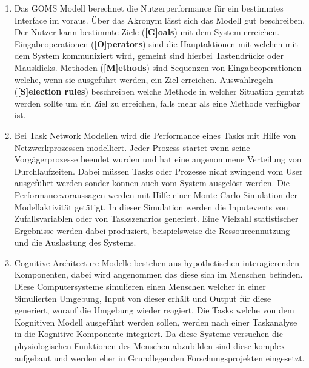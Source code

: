 \documentclass[draft=false
              ,paper=a4
              ,twoside=false
              ,fontsize=11pt
              ,headsepline
              ,BCOR10mm
              ,DIV11
              ]{scrbook}
\begin{document}
\begin{enumerate}
  \item Das GOMS Modell berechnet die Nutzerperformance für ein bestimmtes Interface im voraus. Über das Akronym lässt sich das Modell gut beschreiben. Der Nutzer kann bestimmte Ziele (\textbf{[G]oals}) mit dem System erreichen. Eingabeoperationen (\textbf{[O]perators}) sind die Hauptaktionen mit welchen mit dem System kommuniziert wird, gemeint sind hierbei Tastendrücke oder Mausklicks. Methoden (\textbf{[M]ethods}) sind Sequenzen von Eingabeoperationen welche, wenn sie ausgeführt werden, ein Ziel erreichen. Auswahlregeln (\textbf{[S]election rules}) beschreiben welche Methode in welcher Situation genutzt werden sollte um ein Ziel zu erreichen, falls mehr als eine Methode verfügbar ist.
  \item Bei Task Network Modellen wird die Performance eines Tasks mit Hilfe von Netzwerkprozessen modelliert. Jeder Prozess startet wenn seine Vorgägerprozesse beendet wurden und hat eine angenommene Verteilung von Durchlaufzeiten. Dabei müssen Tasks oder Prozesse nicht zwingend vom User ausgeführt werden sonder können auch vom System ausgelöst werden. Die Performancevoraussagen werden mit Hilfe einer Monte-Carlo Simulation der Modellaktivität getätigt. In dieser Simulation werden die Inputevents von Zufallsvariablen oder von Taskszenarios generiert. Eine Vielzahl statistischer Ergebnisse werden dabei produziert, beispielsweise die Ressourcennutzung und die Auslastung des Systems.
  \item Cognitive Architecture Modelle bestehen aus hypothetischen interagierenden Komponenten, dabei wird angenommen das diese sich im Menschen befinden. Diese Computersysteme simulieren einen Menschen welcher in einer Simulierten Umgebung, Input von dieser erhält und Output für diese generiert, worauf die Umgebung wieder reagiert. Die Tasks welche von dem Kognitiven Modell ausgeführt werden sollen, werden nach einer Taskanalyse in die Kognitive Komponente integriert. Da diese Systeme versuchen die physiologischen Funktionen des Menschen abzubilden sind diese komplex aufgebaut und werden eher in Grundlegenden Forschungsprojekten eingesetzt.
\end{enumerate}
\end{document}
